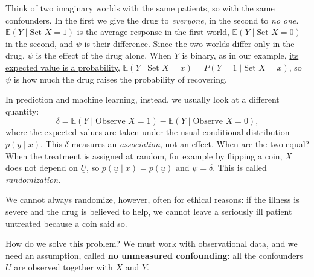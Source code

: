\documentclass[a4paper,12pt,oneside]{report}
\begin{document}
Think of two imaginary worlds with the same patients, so with the same
confounders. In the first we give the drug to \emph{everyone}, in the
second to \emph{no one}. $\mathbb{E}(Y\mid\text{Set }X=1)$ is the average
response in the first world, $\mathbb{E}(Y\mid\text{Set }X=0)$ in the
second, and $\psi$ is their difference. Since the two worlds differ only
in the drug, $\psi$ is the effect of the drug alone. When $Y$ is binary,
as in our example, \hyperref[cor:prob-expected]{its expected value is a
probability}, $\mathbb{E}(Y\mid\text{Set }X=x)=P(Y=1\mid\text{Set }X=x)$, so
$\psi$ is how much the drug raises the probability of recovering.

In prediction and machine learning, instead, we usually look at a
different quantity:
\[
\delta=\mathbb{E}(Y\mid\text{Observe }X=1)-\mathbb{E}(Y\mid\text{Observe }X=0),
\]
where the expected values are taken under the usual conditional
distribution $p(y\mid x)$. This $\delta$ measures an \emph{association},
not an effect. When are the two equal? When the treatment is assigned at
random, for example by flipping a coin, $X$ does not depend on
$\underline{U}$, so \hyperref[note:observe-equals-set]{$p(\underline{u}\mid x)=p(\underline{u})$} and
$\psi=\delta$. This is called \emph{randomization}.

We cannot always randomize, however, often for ethical reasons: if the
illness is severe and the drug is believed to help, we cannot leave a
seriously ill patient untreated because a coin said so.

How do we solve this problem? We must work with observational data, and we need an assumption, called \textbf{no
unmeasured confounding}: all the confounders $\underline{U}$ are observed
together with $X$ and $Y$.
\end{document}
